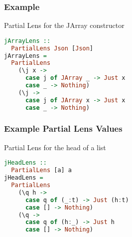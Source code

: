 \begin{frame}[fragile]
\frametitle{Example}

\begin{block}{Partial Lens for the JArray constructor}
\begin{lstlisting}[language=haskell]
jArrayLens ::
  PartialLens Json [Json]
jArrayLens =
  PartialLens
    (\j x -> 
      case j of JArray _ -> Just x
      case _ -> Nothing) 
    (\j -> 
      case j of JArray x -> Just x
      case _ -> Nothing)
\end{lstlisting}
\end{block}

\end{frame}

\begin{frame}[fragile]
\frametitle{Example Partial Lens Values}

\begin{block}{Partial Lens for the head of a list}
\begin{lstlisting}[language=haskell]
jHeadLens ::
  PartialLens [a] a
jHeadLens =
  PartialLens
    (\q h -> 
      case q of (_:t) -> Just (h:t)
      case [] -> Nothing) 
    (\q -> 
      case q of (h:_) -> Just h
      case [] -> Nothing)
\end{lstlisting}
\end{block}

\end{frame}

